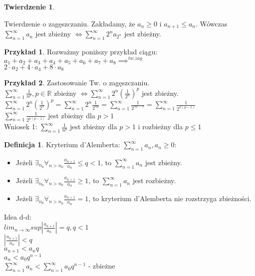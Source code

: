 \documentclass{article}
\theoremstyle{definition}
\newtheorem{de}{Definicja}[subsection]
\theoremstyle{definition}
\newtheorem{tw}{Twierdzenie}[subsection]
\theoremstyle{definition}
\newtheorem{pk}{Przykład}[subsection]
\theoremstyle{definition}
\begin{document}
\begin{tw}
    \begin{center}
    Twierdzenie o zagęszczaniu. Zakładamy, że $a_n\geq 0$ i $a_{n+1} \leq a_n$. Wówczas $\sum_{n=1}^{\infty} a_n$ jest zbieżny $\iff \sum_{n=1}^{\infty} 2^n a_{2^n}$ jest zbieżny.
    \end{center}
\end{tw}

\begin{pk}
    Rozważmy poniższy przykład ciągu:\\
    $a_1+a_2+a_3+a_4+a_5+a_6+a_7+a_8 \implies^{tw. zag} $\\
    $2\cdot a_2 + 4\cdot a_4 + 8\cdot a_8$
\end{pk}

\begin{pk}
    Zastosowanie Tw. o zagęszczaniu.\\
    $\sum_{n=1}^{\infty} \frac{1}{n^p}, p\in\mathbb{R}$ zbieżny $\iff \sum_{n=1}^{\infty} 2^n (\frac{1}{2^n})^p$ jest zbieżny.\\
    $\sum_{n=1}^{\infty} 2^n (\frac{1}{2^n})^p = \sum_{n=1}^{\infty} 2^n \frac{1}{2^{np}} = \sum_{n=1}^{\infty} \frac{1}{2^{np-n}} = \sum_{n=1}^{\infty} \frac{1}{2^{n(p-1)}}$\\
    $\sum_{n=1}^{\infty} \frac{1}{2^{n(p-1)}}$ jest zbieżny dla $p>1$\\
    Wniosek 1: $\sum_{n=1}^{\infty} \frac{1}{n^p}$ jest zbieżny dla $p>1$ i rozbieżny dla $p\leq 1$\\
\end{pk}

\begin{de}
    Kryterium d'Alemberta:
    $\sum_{n=1}^{\infty} a_n, a_n\geq 0$:
    \begin{itemize}
        \item Jeżeli $\exists_{n_0}\forall_{n>n_0} \frac{a_{n+1}}{a_n} \leq q < 1$, to $\sum_{n=1}^{\infty} a_n$ jest zbieżny.
        \item Jeżeli $\exists_{n_0}\forall_{n>n_0} \frac{a_{n+1}}{a_n} \geq 1$, to $\sum_{n=1}^{\infty} a_n$ jest rozbieżny.
        \item Jeżeli $\exists_{n_0}\forall_{n>n_0} \frac{a_{n+1}}{a_n} = 1$, to kryterium d'Alemberta nie rozstrzyga zbieżności.
    \end{itemize}
    Idea d-d: \\
    $lim_{n\rightarrow \infty} sup |\frac{a_{n+1}}{a_n}| = q, q < 1$\\
    $|\frac{a_{n+1}}{a_n}|<q$\\
    $a_{n+1} < a_n q$\\
    $a_n < a_0 q^{n-1}$\\
    $\sum_{n=1}^{\infty} a_n < \sum_{n=1}^{\infty} a_0 q^{n-1}$ - zbieżne
\end{de}
\end{document}
